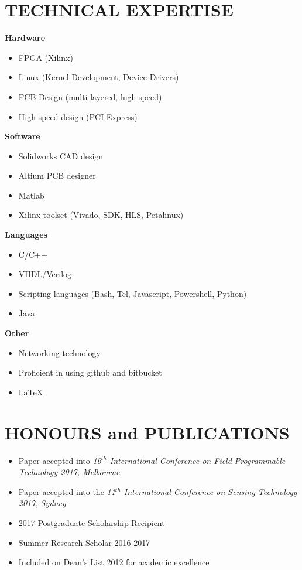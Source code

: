 \documentclass[3pt]{res}
\begin{document}
\begin{resume}
      
 
\section{TECHNICAL EXPERTISE} 
{\bf Hardware} 
    \begin{itemize}[noitemsep]
      \item FPGA (Xilinx)
      \item Linux (Kernel Development, Device Drivers) 
      \item PCB Design (multi-layered, high-speed)
      \item High-speed design (PCI Express)
    \end{itemize}
 {\bf Software} 
    \begin{itemize}[noitemsep]
      \item Solidworks CAD design
      \item Altium PCB designer
      \item Matlab
      \item Xilinx toolset (Vivado, SDK, HLS, Petalinux) 
    \end{itemize}
{\bf Languages} 
    \begin{itemize}[noitemsep]
      \item C/C++
      \item VHDL/Verilog
      \item Scripting languages (Bash, Tcl, Javascript, Powershell, Python)
      \item Java
    \end{itemize}
    
{\bf Other} 
    \begin{itemize}[noitemsep]
       \item Networking technology
      \item Proficient in using github and bitbucket
      \item \LaTeX
    \end{itemize}

\section{HONOURS and PUBLICATIONS} 
\begin{itemize}[noitemsep]
    \item Paper accepted into \textit{16$^{th}$ International Conference on Field-Programmable Technology 2017, Melbourne}
    \item Paper accepted into the \textit{11$^{th}$ International Conference on Sensing Technology 2017, Sydney}
    \item 2017 Postgraduate Scholarship Recipient
    \item Summer Research Scholar 2016-2017
      \item Included on Dean's List 2012 for academic excellence
    \end{itemize}
\end{resume}
%
%
\end{document}
